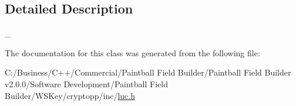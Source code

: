 \subsection{Detailed Description}
\_\- 

The documentation for this class was generated from the following file:\begin{DoxyCompactItemize}
\item 
C:/Business/C++/Commercial/Paintball Field Builder/Paintball Field Builder v2.0.0/Software Development/Paintball Field Builder/WSKey/cryptopp/inc/\hyperlink{luc_8h}{luc.h}\end{DoxyCompactItemize}
